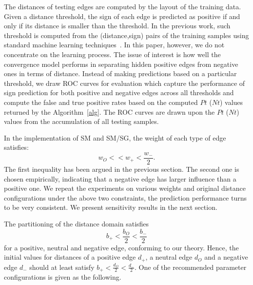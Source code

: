 \documentclass[acmtweb]{acmsmall}
\begin{document}
The distances of testing edges are computed by the layout of the
training data. Given a distance threshold, the sign of each edge is
predicted as positive if and only if its distance is smaller than the
threshold. In the previous work, such threshold is computed from the
(distance,sign) pairs of the training samples using standard machine
learning
techniques~\cite{golbeck:distrust2011}\cite{Leskovec:2010}. In this
paper, however, we do not concentrate on the learning process. The
issue of interest is how well the convergence model performs in
separating hidden positive edges from negative ones in terms of
distance. Instead of making predictions based on a particular
threshold, we draw ROC curves for evaluation which capture the
performance of sign prediction for both positive and negative edges
across all thresholds and compute the false and true positive rates
based on the computed $Pt$ ($Nt$) values returned by the
Algorithm~\ref{alg}. The ROC curves are drawn upon the $Pt$ ($Nt$)
values from the accumulation of all testing samples.

In the implementation of SM and SM/SG, the weight of each type of edge
satisfies:
\[ w_{O}<<w_{+}<\frac{w_{-}}{2}. \] 
The first inequality has been argued in the previous section. The
second one is chosen empirically, indicating that a negative edge has
larger influence than a positive one.  We repeat the experiments on
various weights and original distance configurations under the above
two constraints, the prediction performance turns to be very
consistent. We present sensitivity results in the next section.

The partitioning of the distance domain satisfies
\[ b_{+} < \frac{b_{O}}{2} < \frac{b_{-}}{2} \]
for a positive, neutral and negative edge, conforming to our
theory. Hence, the initial values for distances of a positive edge $d_{+}$, a neutral edge $d_{O}$ and a 
negative edge $d_{-}$ should at least satisfy $b_{+} < \frac{d_{O}}{2} < \frac{d_{-}}{2}$.
One of the recommended parameter configurations is given as
the following.
\begin{table}[htp]
\end{table}
\end{document}
